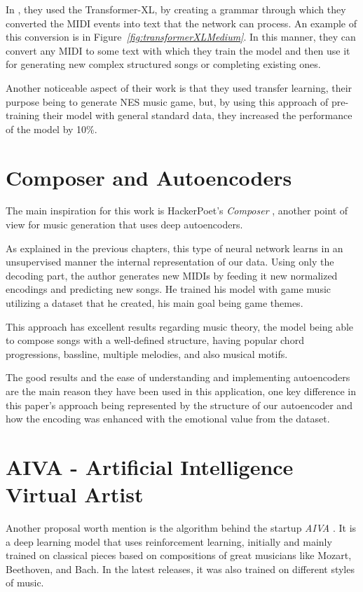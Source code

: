 In \cite{donahue2019lakhnes}, they used the Transformer-XL,
by creating a grammar through which they converted the MIDI events
into text that the network can process.
An example of this conversion is in Figure\emph{~\ref{fig:transformerXLMedium}}.
In this manner,
they can convert any MIDI to some text with
which they train the model and then use it
for generating new complex structured songs or
completing existing ones.


Another noticeable aspect of their work is that they used
transfer learning, their purpose being to generate NES music game,
but, by using this approach of pre-training their model with
general standard data, they increased the performance of the model
by 10\%. \cite{donahue2019lakhnes}


\section{Composer and Autoencoders}
The main inspiration for this work is HackerPoet's \emph{Composer} \cite{hackerPoet},
another point of view for music generation that uses deep autoencoders.

As explained in the previous chapters,
this type of neural network learns in an unsupervised manner the internal representation of our data.
Using only the decoding part,
the author generates new MIDIs by feeding it new normalized encodings and predicting new songs.
He trained his model with game music utilizing a dataset that he created, his main goal being game themes. \cite{hackerPoet}

This approach has excellent results regarding music theory,
the model being able to compose songs with a well-defined structure,
having popular chord progressions, bassline, multiple melodies, and also musical motifs. \cite{hackerPoet}

The good results and the ease of understanding and implementing autoencoders are
the main reason they have been used in this application, one key difference in this paper's
approach being represented by the structure of our autoencoder and how the encoding was
enhanced with the emotional value from the dataset.


\section{AIVA - Artificial Intelligence Virtual Artist}

Another proposal worth mention is the algorithm behind the startup \emph{AIVA} \cite{aiva}.
It is a deep learning model that uses reinforcement learning,
initially and mainly trained on classical pieces based on compositions of great musicians
like Mozart, Beethoven, and Bach.
In the latest releases, it was also trained on different styles of music. \cite{aiva1}


